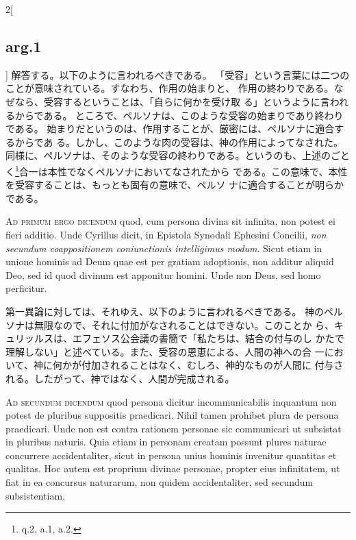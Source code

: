 \documentclass[paper=a4paper,fontsize=10pt,jafontsize=9pt,titlepage]{jlreq}
\begin{document}
\begin{paracol}{2}[\subsection{arg.1}]
解答する。以下のように言われるべきである。
「受容」という言葉には二つのことが意味されている。すなわち、作用の始まりと、
 作用の終わりである。なぜなら、受容するということは、「自らに何かを受け取
 る」というように言われるからである。
ところで、ペルソナは、このような受容の始まりであり終わりである。
始まりだというのは、作用することが、厳密には、ペルソナに適合するからであ
 る。しかし、このような肉の受容は、神の作用によってなされた。
同様に、ペルソナは、そのような受容の終わりである。というのも、上述のごと
 く\footnote{q.2, a.1, a.2.}合一は本性でなくペルソナにおいてなされたから
 である。この意味で、本性を受容することは、もっとも固有の意味で、ペルソ
 ナに適合することが明らかである。

\switchcolumn*[\subsection{ad.1}]

{\scshape Ad primum ergo dicendum} quod, cum persona divina sit infinita, non
potest ei fieri additio. Unde Cyrillus dicit, in Epistola Synodali
Ephesini Concilii, {\itshape non secundum coappositionem coniunctionis
intelligimus modum}. Sicut etiam in unione hominis ad Deum quae est per
gratiam adoptionis, non additur aliquid Deo, sed id quod divinum est
apponitur homini. Unde non Deus, sed homo perficitur.

\switchcolumn

第一異論に対しては、それゆえ、以下のように言われるべきである。
神のペルソナは無限なので、それに付加がなされることはできない。このことか
 ら、キュリッルスは、エフェソス公会議の書簡で「私たちは、結合の付与のし
 かたで理解しない」と述べている。また、受容の恩恵による、人間の神への合
 一において、神に何かが付加されることはなく、むしろ、神的なものが人間に
 付与される。したがって、神ではなく、人間が完成される。

\switchcolumn*[\subsection{ad.2}]

{\scshape Ad secundum dicendum} quod persona dicitur incommunicabilis inquantum non
potest de pluribus suppositis praedicari. Nihil tamen prohibet plura de
persona praedicari. Unde non est contra rationem personae sic
communicari ut subsistat in pluribus naturis. Quia etiam in personam
creatam possunt plures naturae concurrere accidentaliter, sicut in
persona unius hominis invenitur quantitas et qualitas. Hoc autem est
proprium divinae personae, propter eius infinitatem, ut fiat in ea
concursus naturarum, non quidem accidentaliter, sed secundum
subsistentiam.


\end{paracol}
\end{document}
